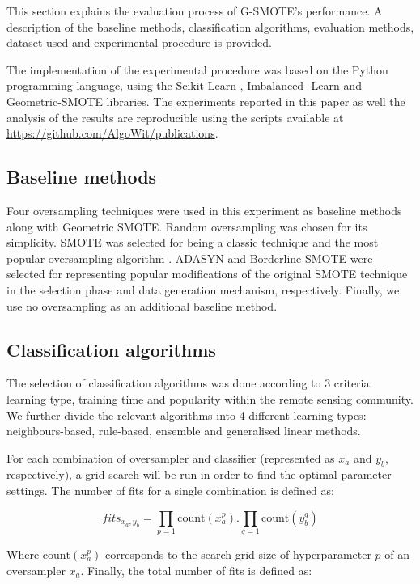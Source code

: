 \documentclass[parskip=full]{scrartcl}
\begin{document}
This section explains the evaluation process of G-SMOTE's performance. A
description of the baseline methods, classification algorithms, evaluation
methods, dataset used and experimental procedure is provided.

The implementation of the experimental procedure was based on the Python
programming language, using the Scikit-Learn \cite{Pedregosa2011}, Imbalanced-
Learn \cite{JMLR:v18:16-365} and Geometric-SMOTE \cite{Douzas2019} libraries.
The experiments reported in this paper as well the analysis of the results are
reproducible using the scripts available at \url{https://github.com/AlgoWit/publications}.

\subsection{Baseline methods}

Four oversampling techniques were used in this experiment as baseline methods
along with Geometric SMOTE. Random oversampling was chosen for its simplicity.
SMOTE was selected for being a classic technique and the most popular
oversampling algorithm \cite{Douzas2019}. ADASYN \cite{HaiboHe2008} and
Borderline SMOTE \cite{Han2005} were selected for representing popular
modifications of the original SMOTE technique in the selection phase and data
generation mechanism, respectively. Finally, we use no oversampling as an
additional baseline method.

\subsection{Classification algorithms}

The selection of classification algorithms was done according to 3 criteria:
learning type, training time and popularity within the remote sensing
community. We further divide the relevant algorithms into 4 different learning
types: neighbours-based, rule-based, ensemble and generalised linear methods.

For each combination of oversampler and classifier (represented as $x_a$ and
$y_b$, respectively), a grid search will be run in order to find the optimal
parameter settings. The number of fits for a single combination  is defined as:

\[
fits_{x_a,y_b}=\prod\limits_{p=1} \textrm{count}(x_a^p).\prod\limits_{q=1}
\textrm{count}(y_b^q)
\]

Where $\textrm{count}(x_a^p)$ corresponds to the search grid size of
hyperparameter $p$ of an oversampler $x_a$. Finally, the total number of fits
is defined as:
\end{document}
